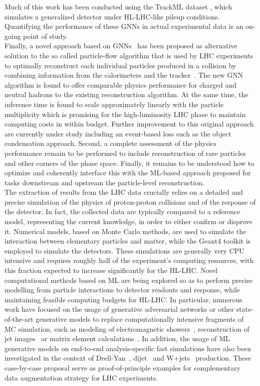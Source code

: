 Much of this work has been conducted using the TrackML dataset \cite{trackml}, which simulates a generalized detector under HL-LHC-like pileup conditions. Quantifying the performance of these GNNs in actual experimental data is an on-going point of study.\\ 

Finally, a novel approach based on GNNs~\cite{Pata:2021oez} has been proposed as alternative solution to the so called particle-flow algorithm that is used by LHC experiments to optimally reconstruct each individual particles produced in a collision by combining information from the calorimeters and the tracker~\cite{Sirunyan:2017ulk}. The new GNN algorithm is found to offer comparable physics performance for charged and neutral hadrons to the existing reconstruction algorithm. At the same time, the inference time is found to scale approximately linearly with the particle multiplicity which is promising for the high-luminosity LHC phase to maintain computing costs in within budget. Further improvement to this original approach are currently under study including an event-based loss such as the object condensation approach. Second, a complete assessment of the physics performance remain to be performed to include reconstruction of rare particles and other corners of the phase space. Finally, it remains to be understood how to optimize and coherently interface this with the ML-based approach proposed for tasks downstream and upstream the particle-level reconstruction.\\

The extraction of results from the LHC data crucially relies on a detailed and precise simulation of the physics of proton-proton collisions and of the response of the detector. In fact, the collected data are typically compared to a reference model, representing the current knowledge, in order to either confirm or disprove it. Numerical models, based on Monte Carlo methods, are used to simulate the interaction between elementary particles and matter, while the Geant4 toolkit is employed to simulate the detectors. These simulations are generally very CPU intensive and requires roughly half of the experiment’s computing resources, with this fraction expected to increase significantly for the HL-LHC. Novel computational methods based on ML are being explored so as to perform precise modelling from particle interactions to detector readouts and response, while maintaining feasible computing budgets for HL-LHC. In particular, numerous work have focused on the usage of generative adversarial networks or other state-of-the-art generative models to replace computationally intensive fragments of MC simulation, such as modeling of electromagnetic showers~\cite{Paganini:2017dwg,Paganini:2017hrr,deOliveira:2017pjk}, reconstruction of jet images~\cite{Musella:2018rdi} or matrix element calculations~\cite{Bendavid:2017zhk}. In addition, the usage of ML generative models on end-to-end analysis-specific fast simulations have also been investigated in the context of Drell-Yan~\cite{Hashemi:2019fkn}, dijet~\cite{DiSipio:2019imz} and W+jets~\cite{Chen:2020uds} production. These case-by-case proposal serve as proof-of-principle examples for complementary data augmentation strategy for LHC experiments.

